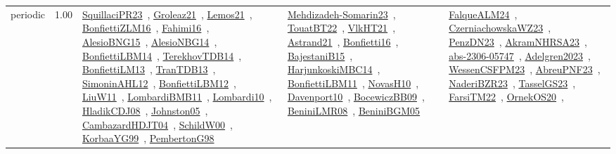 {\begin{longtable}{p{3cm}r>{\raggedright\arraybackslash}p{6cm}>{\raggedright\arraybackslash}p{6cm}>{\raggedright\arraybackslash}p{8cm}}
\index{periodic}\index{Concepts!periodic}periodic &  1.00 & \href{../works/SquillaciPR23.pdf}{SquillaciPR23}~\cite{SquillaciPR23}, \href{../works/Groleaz21.pdf}{Groleaz21}~\cite{Groleaz21}, \href{../works/Lemos21.pdf}{Lemos21}~\cite{Lemos21}, \href{../works/BonfiettiZLM16.pdf}{BonfiettiZLM16}~\cite{BonfiettiZLM16}, \href{../works/Fahimi16.pdf}{Fahimi16}~\cite{Fahimi16}, \href{../works/AlesioBNG15.pdf}{AlesioBNG15}~\cite{AlesioBNG15}, \href{../works/AlesioNBG14.pdf}{AlesioNBG14}~\cite{AlesioNBG14}, \href{../works/BonfiettiLBM14.pdf}{BonfiettiLBM14}~\cite{BonfiettiLBM14}, \href{../works/TerekhovTDB14.pdf}{TerekhovTDB14}~\cite{TerekhovTDB14}, \href{../works/BonfiettiLM13.pdf}{BonfiettiLM13}~\cite{BonfiettiLM13}, \href{../works/TranTDB13.pdf}{TranTDB13}~\cite{TranTDB13}, \href{../works/SimoninAHL12.pdf}{SimoninAHL12}~\cite{SimoninAHL12}, \href{../works/BonfiettiLBM12.pdf}{BonfiettiLBM12}~\cite{BonfiettiLBM12}, \href{../works/LiuW11.pdf}{LiuW11}~\cite{LiuW11}, \href{../works/LombardiBMB11.pdf}{LombardiBMB11}~\cite{LombardiBMB11}, \href{../works/Lombardi10.pdf}{Lombardi10}~\cite{Lombardi10}, \href{../works/HladikCDJ08.pdf}{HladikCDJ08}~\cite{HladikCDJ08}, \href{../works/Johnston05.pdf}{Johnston05}~\cite{Johnston05}, \href{../works/CambazardHDJT04.pdf}{CambazardHDJT04}~\cite{CambazardHDJT04}, \href{../works/SchildW00.pdf}{SchildW00}~\cite{SchildW00}, \href{../works/KorbaaYG99.pdf}{KorbaaYG99}~\cite{KorbaaYG99}, \href{../works/PembertonG98.pdf}{PembertonG98}~\cite{PembertonG98} & \href{../works/Mehdizadeh-Somarin23.pdf}{Mehdizadeh-Somarin23}~\cite{Mehdizadeh-Somarin23}, \href{../works/TouatBT22.pdf}{TouatBT22}~\cite{TouatBT22}, \href{../works/VlkHT21.pdf}{VlkHT21}~\cite{VlkHT21}, \href{../works/Astrand21.pdf}{Astrand21}~\cite{Astrand21}, \href{../works/Bonfietti16.pdf}{Bonfietti16}~\cite{Bonfietti16}, \href{../works/BajestaniB15.pdf}{BajestaniB15}~\cite{BajestaniB15}, \href{../works/HarjunkoskiMBC14.pdf}{HarjunkoskiMBC14}~\cite{HarjunkoskiMBC14}, \href{../works/BonfiettiLBM11.pdf}{BonfiettiLBM11}~\cite{BonfiettiLBM11}, \href{../works/NovasH10.pdf}{NovasH10}~\cite{NovasH10}, \href{../works/Davenport10.pdf}{Davenport10}~\cite{Davenport10}, \href{../works/BocewiczBB09.pdf}{BocewiczBB09}~\cite{BocewiczBB09}, \href{../works/BeniniLMR08.pdf}{BeniniLMR08}~\cite{BeniniLMR08}, \href{../works/BeniniBGM05.pdf}{BeniniBGM05}~\cite{BeniniBGM05} & \href{../works/FalqueALM24.pdf}{FalqueALM24}~\cite{FalqueALM24}, \href{../works/CzerniachowskaWZ23.pdf}{CzerniachowskaWZ23}~\cite{CzerniachowskaWZ23}, \href{../works/PenzDN23.pdf}{PenzDN23}~\cite{PenzDN23}, \href{../works/AkramNHRSA23.pdf}{AkramNHRSA23}~\cite{AkramNHRSA23}, \href{../works/abs-2306-05747.pdf}{abs-2306-05747}~\cite{abs-2306-05747}, \href{../works/Adelgren2023.pdf}{Adelgren2023}~\cite{Adelgren2023}, \href{../works/WessenCSFPM23.pdf}{WessenCSFPM23}~\cite{WessenCSFPM23}, \href{../works/AbreuPNF23.pdf}{AbreuPNF23}~\cite{AbreuPNF23}, \href{../works/NaderiBZR23.pdf}{NaderiBZR23}~\cite{NaderiBZR23}, \href{../works/TasselGS23.pdf}{TasselGS23}~\cite{TasselGS23}, \href{../works/FarsiTM22.pdf}{FarsiTM22}~\cite{FarsiTM22}, \href{../works/OrnekOS20.pdf}{OrnekOS20}~\cite{OrnekOS20}, 
\end{longtable}}
